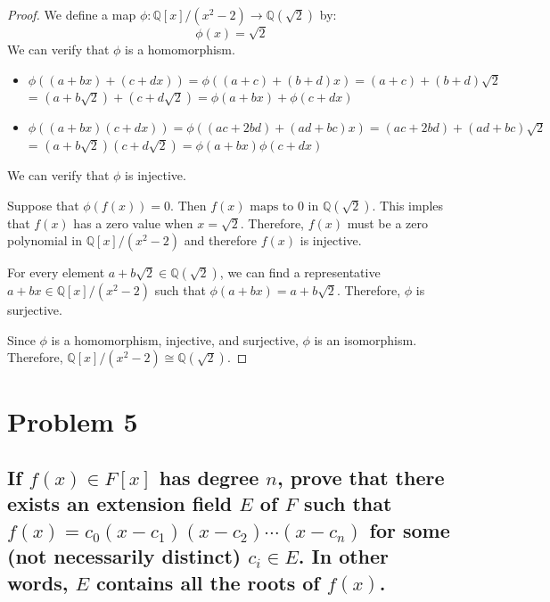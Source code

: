 \documentclass{article}
\theoremstyle{plain} %
\theoremstyle{definition} %
\begin{document}
\begin{proof}
    We define a map $\phi: \mathbb{Q}[x]/(x^2-2) \to \mathbb{Q}(\sqrt{2})$ by:
    \[
        \phi(x) = \sqrt{2}
    \]
    We can verify that $\phi$ is a homomorphism.
    \begin{itemize}
        \item $\phi((a+bx) + (c+dx)) = \phi((a+c) + (b+d)x) = (a+c) + (b+d)\sqrt{2}$
            = $(a+b\sqrt{2}) + (c+d\sqrt{2}) = \phi(a+bx) + \phi(c+dx)$
        \item $\phi((a+bx)(c+dx)) = \phi((ac + 2bd) + (ad + bc)x) = (ac + 2bd) + (ad + bc)\sqrt{2}$
            = $(a+b\sqrt{2})(c+d\sqrt{2}) = \phi(a+bx)\phi(c+dx)$
    \end{itemize}

    We can verify that $\phi$ is injective.

    Suppose that $\phi(f(x)) = 0$. Then $f(x) \text{ maps to } 0$ in $\mathbb{Q}(\sqrt{2})$.
    This imples that $f(x)$ has a zero value when $x = \sqrt{2}$. Therefore, $f(x)$ must
    be a zero polynomial in $\mathbb{Q}[x]/(x^2-2)$ and therefore $f(x)$ is injective.
    
    For every element $a + b\sqrt{2} \in \mathbb{Q}(\sqrt{2})$, we can find a representative $a + bx \in \mathbb{Q}[x]/(x^2-2)$
    such that $\phi(a + bx) = a + b\sqrt{2}$. Therefore, $\phi$ is surjective.

    Since $\phi$ is a homomorphism, injective, and surjective, $\phi$ is an isomorphism.
    Therefore, $\mathbb{Q}[x]/(x^2-2) \cong \mathbb{Q}(\sqrt{2})$.
\end{proof}

\section*{Problem 5}
\subsection*{If $f(x) \in F[x]$ has degree $n$, prove that there exists
an extension field $E$ of $F$ such that $f(x)= c_0(x-c_1)(x-c_2)\cdots (x-c_n)$
for some (not necessarily distinct) $c_i \in E$. In other words, $E$ contains
all the roots of $f(x)$.}
\end{document}
